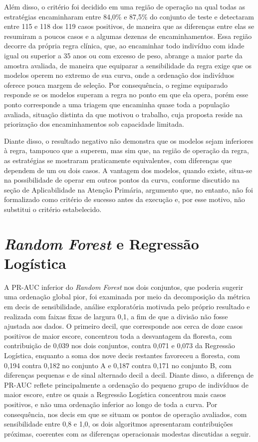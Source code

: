 Além disso, o critério foi decidido em uma região de operação na qual todas as estratégias encaminharam entre 84,0\% e 87,5\% do conjunto de teste e detectaram entre 115 e 118 dos 119 casos positivos, de maneira que as diferenças entre elas se resumiram a poucos casos e a algumas dezenas de encaminhamentos. Essa região decorre da própria regra clínica, que, ao encaminhar todo indivíduo com idade igual ou superior a 35 anos ou com excesso de peso, abrange a maior parte da amostra avaliada, de maneira que equiparar a sensibilidade da regra exige que os modelos operem no extremo de sua curva, onde a ordenação dos indivíduos oferece pouca margem de seleção. Por consequência, o regime equiparado responde se os modelos superam a regra no ponto em que ela opera, porém esse ponto corresponde a uma triagem que encaminha quase toda a população avaliada, situação distinta da que motivou o trabalho, cuja proposta reside na priorização dos encaminhamentos sob capacidade limitada.

Diante disso, o resultado negativo não demonstra que os modelos sejam inferiores à regra, tampouco que a superem, mas sim que, na região de operação da regra, as estratégias se mostraram praticamente equivalentes, com diferenças que dependem de um ou dois casos. A vantagem dos modelos, quando existe, situa-se na possibilidade de operar em outros pontos da curva, conforme discutido na seção de Aplicabilidade na Atenção Primária, argumento que, no entanto, não foi formalizado como critério de sucesso antes da execução e, por esse motivo, não substitui o critério estabelecido.

\section{\textit{Random Forest} e Regressão Logística}\label{sec:disc-algoritmos}
A PR-AUC inferior do \textit{Random Forest} nos dois conjuntos, que poderia sugerir uma ordenação global pior, foi examinada por meio da decomposição da métrica em decis de sensibilidade, análise exploratória motivada pelo próprio resultado e realizada com faixas fixas de largura 0,1, a fim de que a divisão não fosse ajustada aos dados. O primeiro decil, que corresponde aos cerca de doze casos positivos de maior escore, concentrou toda a desvantagem da floresta, com contribuição de 0,039 nos dois conjuntos, contra 0,071 e 0,073 da Regressão Logística, enquanto a soma dos nove decis restantes favoreceu a floresta, com 0,194 contra 0,182 no conjunto A e 0,187 contra 0,171 no conjunto B, com diferenças pequenas e de sinal alternado decil a decil. Diante disso, a diferença de PR-AUC reflete principalmente a ordenação do pequeno grupo de indivíduos de maior escore, entre os quais a Regressão Logística concentrou mais casos positivos, e não uma ordenação inferior ao longo de toda a curva. Por consequência, nos decis em que se situam os pontos de operação avaliados, com sensibilidade entre 0,8 e 1,0, os dois algoritmos apresentaram contribuições próximas, coerentes com as diferenças operacionais modestas discutidas a seguir.

